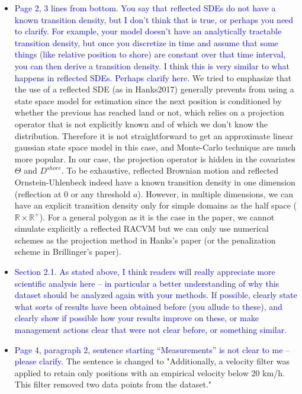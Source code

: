 \documentclass{amsart}
\theoremstyle{plain}
\theoremstyle{remark}
\newcommand {\R}{\mathbb{R}}
\newcommand {\1}{\mathbb{1}}
\begin{document}
\begin{itemize}
    \item \textcolor{blue}{Page 2, 3 lines from bottom.  You say that reflected SDEs do not have a known transition density, but I don’t think that is true, or perhaps you need to clarify.  For example, your model doesn’t have an analytically tractable transition density, but once you discretize in time and assume that some things (like relative position to shore) are constant over that time interval, you can then derive a transition density.  I think this is very similar to what happens in reflected SDEs.  Perhaps clarify here.}
    We tried to emphasize that the use of a reflected SDE (as in Hanks2017) generally prevents from using a state space model for estimation since the next position is conditioned by whether the previous has reached land or not, which relies on a projection operator that is not explicitly known and of which we don't know the distribution. Therefore it is not straightforward to get an approximate linear gaussian state space model in this case, and Monte-Carlo technique are much more popular. In our case, the projection operator is hidden in the covariates $\Theta$ and $D^{shore}$.
    To be exhaustive, reflected Brownian motion and reflected Ornstein-Uhlenbeck indeed have a known transition density in one dimension (reflection at $0$ or any threshold $a$). However, in multiple dimensions, we can have an explicit transition density only for simple domains as the half space ($\R \times \R^+$). For a general polygon as it is the case in the paper, we cannot simulate explicitly a reflected RACVM but we can only use numerical schemes as the projection method in Hanks's paper (or the penalization scheme in Brillinger's paper).

    \item \textcolor{blue}{ Section 2.1.  As stated above, I think readers will really appreciate more scientific analysis here – in particular a better understanding of why this dataset should be analyzed again with your methods.  If possible, clearly state what sorts of results have been obtained before (you allude to these), and clearly show if possible how your results improve on these, or make management actions clear that were not clear before, or something similar.}

    \item \textcolor{blue}{Page 4, paragraph 2, sentence starting “Measurements” is not clear to me – please clarify.} The sentence is changed to "Additionally, a velocity filter was applied to retain only positions with an empirical velocity below 20 km/h. This filter removed two data points from the dataset."


\end{itemize}
\end{document}
